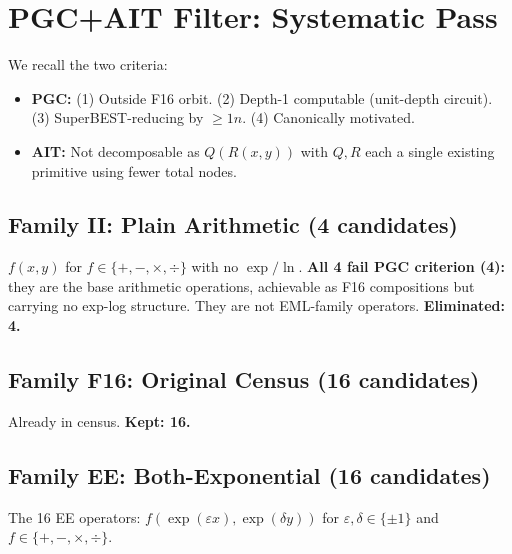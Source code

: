 \documentclass[11pt]{article}
\begin{document}
\section{PGC+AIT Filter: Systematic Pass}
\label{sec:filter}

We recall the two criteria:

\begin{itemize}
  \item \textbf{PGC:} (1) Outside F16 orbit. (2) Depth-1 computable (unit-depth circuit).
        (3) SuperBEST-reducing by $\geq 1n$. (4) Canonically motivated.
  \item \textbf{AIT:} Not decomposable as $Q(R(x,y))$ with $Q, R$ each a single
        existing primitive using fewer total nodes.
\end{itemize}

\subsection{Family II: Plain Arithmetic (4 candidates)}

$f(x, y)$ for $f \in \{+,-,\times,\div\}$ with no $\exp/\ln$.
\textbf{All 4 fail PGC criterion (4):} they are the base arithmetic operations,
achievable as F16 compositions but carrying no exp-log structure.
They are not EML-family operators.
\textbf{Eliminated: 4.}

\subsection{Family F16: Original Census (16 candidates)}

Already in census. \textbf{Kept: 16.}

\subsection{Family EE: Both-Exponential (16 candidates)}

The 16 EE operators: $f(\exp(\varepsilon x), \exp(\delta y))$ for
$\varepsilon, \delta \in \{\pm 1\}$ and $f \in \{+,-,\times,\div\}$.
\end{document}
